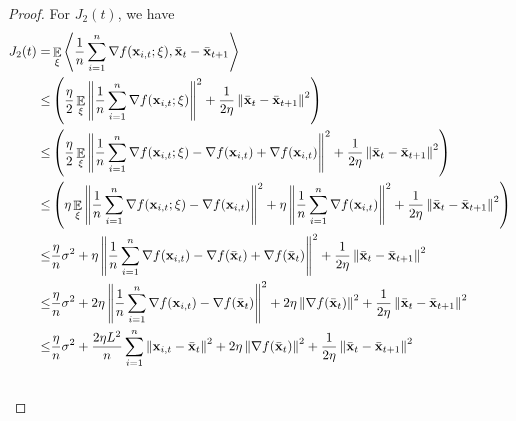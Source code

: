 \documentclass{article}
\begin{document}
\begin{proof}
For $J_2(t)$, we have
\begin{align}
\nonumber
J_2(t) = & \mathop{\mathbb{E}}_{\xi}\left\langle\frac{1}{n}\sum_{i=1}^n\nabla f({\bf x}_{i,t};\xi), \bar{{\bf x}}_t - \bar{{\bf x}}_{t+1}  \right\rangle \\ \nonumber
\le & \left( \frac{\eta}{2}\mathop{\mathbb{E}}_{\xi} \left\lVert\frac{1}{n}\sum_{i=1}^n \nabla f({\bf x}_{i,t};\xi)\right\rVert^2 + \frac{1}{2\eta} \left\lVert \bar{{\bf x}}_t - \bar{{\bf x}}_{t+1}\right\rVert^2  \right) \\ \nonumber
\le & \left( \frac{\eta}{2}\mathop{\mathbb{E}}_{\xi}\left\lVert\frac{1}{n}\sum_{i=1}^n\nabla f({\bf x}_{i,t};\xi) - \nabla f({\bf x}_{i,t}) + \nabla f({\bf x}_{i,t})\right\rVert^2 + \frac{1}{2\eta} \left\lVert \bar{{\bf x}}_t - \bar{{\bf x}}_{t+1}\right\rVert^2  \right) \\ \nonumber
\le & \left(  \eta\mathop{\mathbb{E}}_{\xi}\left\lVert\frac{1}{n}\sum_{i=1}^n\nabla f({\bf x}_{i,t};\xi) - \nabla f({\bf x}_{i,t})\right\rVert^2 + \eta \left\lVert\frac{1}{n}\sum_{i=1}^n\nabla f({\bf x}_{i,t})\right\rVert^2 + \frac{1}{2\eta} \left\lVert \bar{{\bf x}}_t - \bar{{\bf x}}_{t+1}\right\rVert^2  \right) \\ \nonumber
\le & \frac{\eta}{n} \sigma^2 + \eta \left\lVert\frac{1}{n}\sum_{i=1}^n\nabla f({\bf x}_{i,t}) - \nabla f(\bar{{\bf x}}_t) + \nabla f(\bar{{\bf x}}_t)\right\rVert^2 + \frac{1}{2\eta} \left\lVert \bar{{\bf x}}_t - \bar{{\bf x}}_{t+1}\right\rVert^2 \\ \nonumber
\le & \frac{\eta}{n} \sigma^2 + 2\eta \left\lVert\frac{1}{n}\sum_{i=1}^n\nabla f({\bf x}_{i,t}) - \nabla f(\bar{{\bf x}}_t) \right\rVert^2 + 2\eta \left\lVert\nabla f(\bar{{\bf x}}_t)\right\rVert^2 + \frac{1}{2\eta} \left\lVert \bar{{\bf x}}_t - \bar{{\bf x}}_{t+1}\right\rVert^2 \\ \nonumber
\le & \frac{\eta}{n} \sigma^2 + \frac{2\eta L^2}{n}\sum_{i=1}^n \left\lVert{\bf x}_{i,t} - \bar{{\bf x}}_t \right\rVert^2 + 2\eta \left\lVert\nabla f(\bar{{\bf x}}_t)\right\rVert^2 + \frac{1}{2\eta} \left\lVert \bar{{\bf x}}_t - \bar{{\bf x}}_{t+1}\right\rVert^2 \\ \nonumber
\end{align} 




\end{proof}
\end{document}
